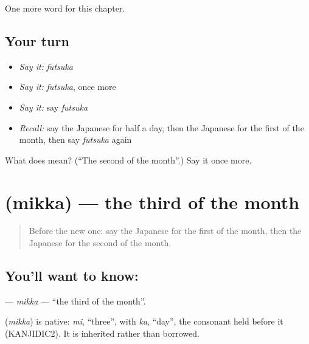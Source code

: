 \begin{grammarlens}[title={What you've built}]
One more word for this chapter.
\end{grammarlens}

\subsection*{Your turn}
\begin{itemize}
\raggedright
  \item \emph{Say it:} \emph{futsuka}
  \item \emph{Say it:} \emph{futsuka}, once more
  \item \emph{Say it:} say \emph{futsuka}
  \item \emph{Recall:} say the Japanese for half a day, then the Japanese for the first of the month, then say \emph{futsuka} again
\end{itemize}

\begin{tcolorbox}[breakable,colback=teal!4,colframe=teal!35!black,title={Before you move on}]
What does  mean? (\textquotedblleft{}The second of the month\textquotedblright{}.) Say it once more.
\end{tcolorbox}
\section[\texorpdfstring{\ja{みっか} (mikka)}{みっか (mikka)}]{ (mikka) — the third of the month}

\label{lesson:JA-C77-mikka}



\begin{quote}
Before the new one: say the Japanese for the first of the month, then the Japanese for the second of the month.
\end{quote}

\subsection*{You'll want to know: }
\textbf{} — \emph{mikka} — \textquotedblleft{}the third of the month\textquotedblright{}.

\begin{cousinweb}
\textbf{} (\emph{mikka}) is native: \emph{mi}, \textquotedblleft{}three\textquotedblright{}, with \emph{ka}, \textquotedblleft{}day\textquotedblright{}, the consonant held before it (KANJIDIC2). It is inherited rather than borrowed.
\end{cousinweb}

